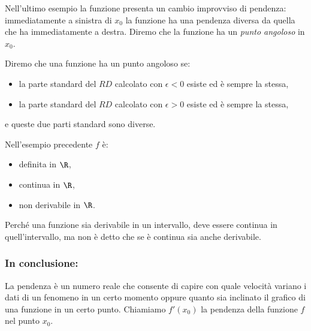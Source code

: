 Nell'ultimo esempio la funzione presenta un cambio improvviso di pendenza:
immediatamente a sinistra di \(x_0\) la funzione ha una pendenza diversa 
da quella che ha immediatamente a destra. 
Diremo che la funzione ha un \emph{punto angoloso} in \(x_0\).

\begin{definizione}
Diremo che una funzione ha un punto angoloso se: 
\begin{itemize} [nosep]
\item 
la parte standard del \(RD\) calcolato con 
\(\epsilon < 0\) esiste ed è sempre la stessa,
\item 
la parte standard del \(RD\) calcolato con 
\(\epsilon > 0\) esiste ed è sempre la stessa,
\end{itemize}
e queste due parti standard sono diverse.
\end{definizione}

\begin{osservazione}

Nell'esempio precedente \(f\) è:
\begin{multicols}{3}
\begin{itemize} [nosep]
\item definita in \(\R\),
\item continua in \(\R\),
\item non derivabile in \(\R\).
\end{itemize}
\end{multicols}
Perché una funzione sia derivabile in un intervallo, 
deve essere continua in quell'intervallo, 
ma non è detto che se è continua sia anche derivabile.
\end{osservazione}

\subsubsection{In conclusione:} 
La pendenza è un numero reale che consente di capire con quale 
velocità variano i dati di un fenomeno in un certo momento oppure quanto sia 
inclinato il grafico di una funzione in un certo punto.
Chiamiamo \(f'(x_0)\) la pendenza della funzione \(f\) nel punto \(x_0\).


